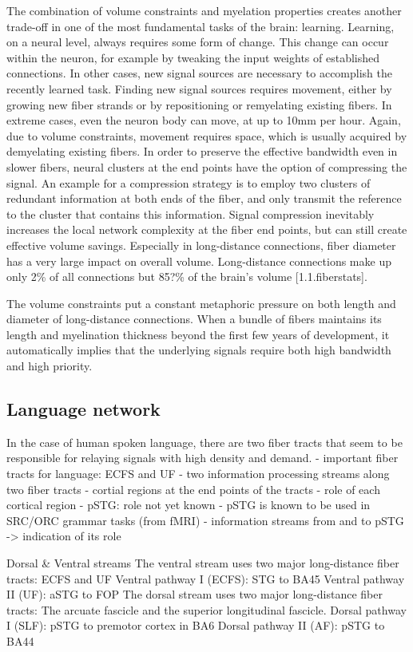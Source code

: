 The combination of volume constraints and myelation properties creates another trade-off in one of the most fundamental tasks of the brain: learning.
Learning, on a neural level, always requires some form of change.
This change can occur within the neuron, for example by tweaking the input weights of established connections.
In other cases, new signal sources are necessary to accomplish the recently learned task.
Finding new signal sources requires movement, either by growing new fiber strands or by repositioning or remyelating existing fibers.
In extreme cases, even the neuron body can move, at up to 10mm per hour.
Again, due to volume constraints, movement requires space, which is usually acquired by demyelating existing fibers.
In order to preserve the effective bandwidth even in slower fibers, neural clusters at the end points have the option of compressing the signal.
An example for a compression strategy is to employ two clusters of redundant information at both ends of the fiber, and only transmit the reference to the cluster that contains this information.
Signal compression inevitably increases the local network complexity at the fiber end points, but can still create effective volume savings.
Especially in long-distance connections, fiber diameter has a very large impact on overall volume.
Long-distance connections make up only 2\% of all connections but 85?\% of the brain's volume [1.1.fiberstats].

The volume constraints put a constant metaphoric pressure on both length and diameter of long-distance connections.
When a bundle of fibers maintains its length and myelination thickness beyond the first few years of development, it automatically implies that the underlying signals require both high bandwidth and high priority.

\subsection{Language network}
In the case of human spoken language, there are two fiber tracts that seem to be responsible for relaying signals with high density and demand.
- important fiber tracts for language: ECFS and UF
- two information processing streams along two fiber tracts
- cortial regions at the end points of the tracts
- role of each cortical region
- pSTG: role not yet known
- pSTG is known to be used in SRC/ORC grammar tasks (from fMRI)
- information streams from and to pSTG -> indication of its role

Dorsal \& Ventral streams
The ventral stream uses two major long-distance fiber tracts: ECFS and UF
Ventral pathway I (ECFS): STG to BA45
Ventral pathway II (UF): aSTG to FOP
The dorsal stream uses two major long-distance fiber tracts: The arcuate fascicle and the superior longitudinal fascicle.
Dorsal pathway I (SLF): pSTG to premotor cortex in BA6
Dorsal pathway II (AF): pSTG to BA44

